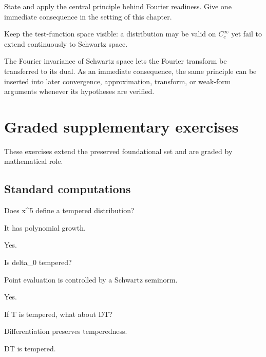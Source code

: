\begin{exercise}\label{exr:iii18-08}
State and apply the central principle behind Fourier readiness. Give one immediate consequence in the setting of this chapter.
\end{exercise}
\begin{hint}
Keep the test-function space visible: a distribution may be valid on \(C_c^\infty\) yet fail to extend continuously to Schwartz space.
\end{hint}
\begin{solution}
The Fourier invariance of Schwartz space lets the Fourier transform be transferred to its dual. As an immediate consequence, the same principle can be inserted into later convergence, approximation, transform, or weak-form arguments whenever its hypotheses are verified.
\end{solution}


\section{Graded supplementary exercises}
These exercises extend the preserved foundational set and are graded by mathematical role.

\subsection*{Standard computations}

\begin{exercise}[Polynomial]\label{exr:iii18-expand-01}
Does x\textasciicircum{}5 define a tempered distribution?
\end{exercise}
\begin{hint}
It has polynomial growth.
\end{hint}
\begin{solution}
Yes.
\end{solution}

\begin{exercise}[Dirac]\label{exr:iii18-expand-02}
Is delta\_0 tempered?
\end{exercise}
\begin{hint}
Point evaluation is controlled by a Schwartz seminorm.
\end{hint}
\begin{solution}
Yes.
\end{solution}

\begin{exercise}[Derivative]\label{exr:iii18-expand-03}
If T is tempered, what about DT?
\end{exercise}
\begin{hint}
Differentiation preserves temperedness.
\end{hint}
\begin{solution}
DT is tempered.
\end{solution}

